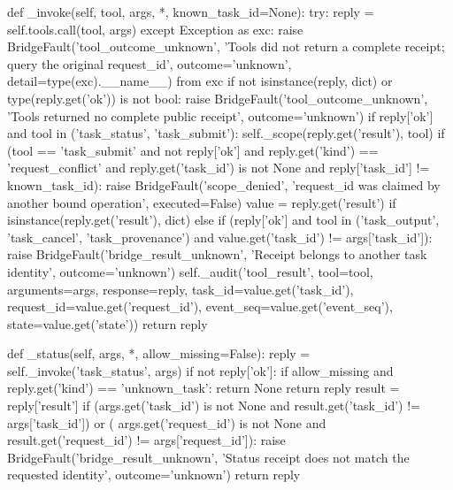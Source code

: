     def _invoke(self, tool, args, *, known_task_id=None):
        try:
            reply = self.tools.call(tool, args)
        except Exception as exc:
            raise BridgeFault('tool_outcome_unknown', 'Tools did not return a complete receipt; query the original request_id',
                              outcome='unknown', detail=type(exc).__name__) from exc
        if not isinstance(reply, dict) or type(reply.get('ok')) is not bool:
            raise BridgeFault('tool_outcome_unknown', 'Tools returned no complete public receipt', outcome='unknown')
        if reply['ok'] and tool in ('task_status', 'task_submit'):
            self._scope(reply.get('result'), tool)
        if (tool == 'task_submit' and not reply['ok'] and reply.get('kind') == 'request_conflict'
                and reply.get('task_id') is not None and reply['task_id'] != known_task_id):
            raise BridgeFault('scope_denied', 'request_id was claimed by another bound operation', executed=False)
        value = reply.get('result') if isinstance(reply.get('result'), dict) else {}
        if (reply['ok'] and tool in ('task_output', 'task_cancel', 'task_provenance')
                and value.get('task_id') != args['task_id']):
            raise BridgeFault('bridge_result_unknown', 'Receipt belongs to another task identity', outcome='unknown')
        self._audit('tool_result', tool=tool, arguments=args, response=reply,
                    task_id=value.get('task_id'), request_id=value.get('request_id'),
                    event_seq=value.get('event_seq'), state=value.get('state'))
        return reply

    def _status(self, args, *, allow_missing=False):
        reply = self._invoke('task_status', args)
        if not reply['ok']:
            if allow_missing and reply.get('kind') == 'unknown_task':
                return None
            return reply
        result = reply['result']
        if (args.get('task_id') is not None and result.get('task_id') != args['task_id']) or (
                args.get('request_id') is not None and result.get('request_id') != args['request_id']):
            raise BridgeFault('bridge_result_unknown', 'Status receipt does not match the requested identity', outcome='unknown')
        return reply

